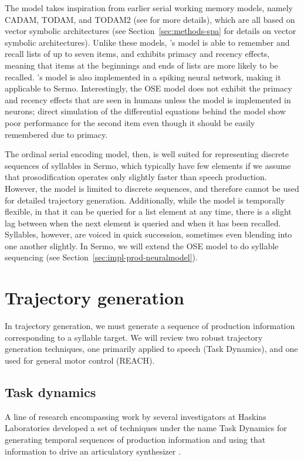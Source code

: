 The model takes inspiration from
earlier serial working memory models,
namely CADAM, TODAM, and TODAM2
(see \citealt{choo2010} for more details),
which are all based on
vector symbolic architectures
(see Section~\ref{sec:methods-spa}
for details on vector symbolic architectures).
Unlike these models,
\citeauthor{choo2010}'s model
is able to remember and recall
lists of up to seven items,
and exhibits primacy and recency effects,
meaning that items at the beginnings
and ends of lists are more likely
to be recalled.
\citeauthor{choo2010}'s model is also implemented
in a spiking neural network,
making it applicable to Sermo.
Interestingly,
the OSE model does not exhibit
the primacy and recency effects
that are seen in humans
unless the model
is implemented in neurons;
direct simulation of the differential equations
behind the model show
poor performance for the second item
even though it should be easily remembered
due to primacy.

The ordinal serial encoding model,
then, is well suited for representing
discrete sequences of syllables in Sermo,
which typically have few elements
if we assume that prosodification
operates only slightly faster
than speech production.
However, the model is limited to
discrete sequences,
and therefore cannot be used
for detailed trajectory generation.
Additionally,
while the model is temporally flexible,
in that it can be queried for
a list element at any time,
there is a slight lag between
when the next element is queried
and when it has been recalled.
Syllables, however, are voiced in quick succession,
sometimes even blending into one another slightly.
In Sermo, we will extend the OSE model
to do syllable sequencing
(see Section~\ref{sec:impl-prod-neuralmodel}).

\section{Trajectory generation}

In trajectory generation,
we must generate a sequence
of production information
corresponding to a syllable target.
We will review two robust trajectory generation techniques,
one primarily applied to speech
(Task Dynamics),
and one used for general motor control
(REACH).

\subsection{Task dynamics}

A line of research encompassing work by
several investigators at Haskins Laboratories
developed a set of techniques
under the name Task Dynamics
for generating temporal sequences
of production information
and using that information to drive
an articulatory synthesizer
\citep{saltzman1989,nam2004}.

